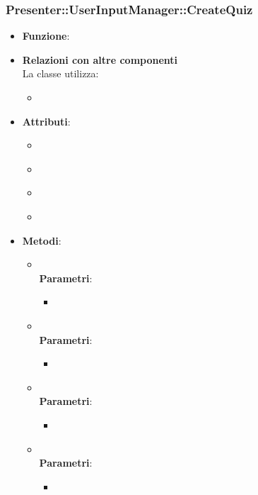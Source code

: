\subsubsection{Presenter::UserInputManager::CreateQuiz}
\begin{itemize}
\item\textbf{Funzione}:
\item\textbf{Relazioni con altre componenti}\\
La classe utilizza:
	\begin{itemize}
		\item
	\end{itemize}
\item\textbf{Attributi}:
	\begin{itemize}
		\item\code{}\\
		\item\code{}\\
		\item\code{}\\
		\item\code{}\\
	\end{itemize}
\item\textbf{Metodi}:
	\begin{itemize}
		\item\code{}\\
		\textbf{Parametri}:
			\begin{itemize}
				\item\code{}\\
			\end{itemize}
		\item\code{}\\
		\textbf{Parametri}:
			\begin{itemize}
				\item\code{}\\
			\end{itemize}
		\item\code{}\\
		\textbf{Parametri}:
			\begin{itemize}
				\item\code{}\\
			\end{itemize}
		\item\code{}\\
		\textbf{Parametri}:
			\begin{itemize}
				\item\code{}\\
			\end{itemize}
	\end{itemize}
\end{itemize}

